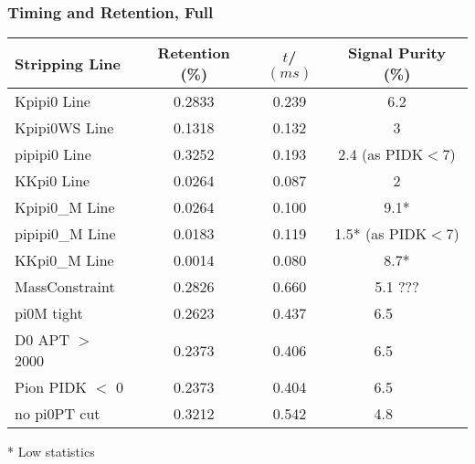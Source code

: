 \documentclass[10pt,a4paper]{beamer}
\begin{document}
\begin{frame}
\frametitle{Timing and Retention, Full}
\begin{center}
\begin{tabular}{l|ccc}
\hline
\hline
\vspace{0.5em}
Stripping Line    & Retention (\%) & $t$/$(ms)$ & Signal Purity (\%) \\
\hline
Kpipi0 Line       & 0.2833         & 0.239      & 6.2                \\
Kpipi0WS  Line    & 0.1318         & 0.132      & 3                  \\
pipipi0 Line      & 0.3252         & 0.193      & 2.4 (as PIDK$<$7) \\
KKpi0 Line        & 0.0264         & 0.087      & 2                  \\
Kpipi0\_M Line    & 0.0264         & 0.100      & 9.1*                \\
pipipi0\_M Line   & 0.0183         & 0.119      & 1.5* (as PIDK$<$7)    \\
KKpi0\_M Line     & 0.0014         & 0.080      & 8.7*                \\
MassConstraint    & 0.2826         & 0.660      & 5.1 ???            \\
pi0M tight        & 0.2623         & 0.437      & 6.5 ~~~            \\
D0 APT $>$ 2000   & 0.2373         & 0.406      & 6.5 ~~~            \\
Pion PIDK $<$ 0   & 0.2373         & 0.404      & 6.5 ~~~            \\
no pi0PT cut      & 0.3212         & 0.542      & 4.8 ~~~            \\
\hline
\hline
\end{tabular}
\end{center}
\newline
\vspace{1.0em}
* Low statistics
\end{frame}
\end{document}
